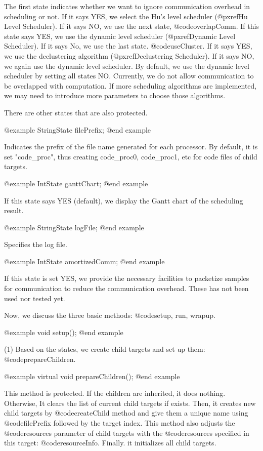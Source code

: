 The first state indicates whether we want to ignore communication overhead
in scheduling or not. If it says YES, we select the Hu's level scheduler
(@pxref{Hu Level Scheduler}). If it says NO, we use the next state,
@code{overlapComm}. If this state says YES, we use the dynamic level scheduler
(@pxref{Dynamic Level Scheduler}). If it says No, we use the last state.
@code{useCluster}. If it says YES, we use the declustering algorithm
(@pxref{Declustering Scheduler}). If it says NO, we again use the dynamic
level scheduler. By default, we use the dynamic level scheduler by setting
all states NO. Currently, we do not allow communication to be overlapped
with computation. If more scheduling algorithms are implemented, we may need
to introduce more parameters to choose those algorithms. 

There are other states that are also protected.

@example
StringState filePrefix;
@end example

Indicates the prefix of the file name generated for each processor.
By default, it is set "code_proc", thus creating code_proc0, code_proc1, etc
for code files of child targets.

@example
IntState ganttChart;
@end example

If this state says YES (default), we display the Gantt chart of the 
scheduling result. 

@example
StringState logFile;
@end example

Specifies the log file.

@example
IntState amortizedComm;
@end example

If this state is set YES, we provide the necessary facilities to packetize
samples for communication to reduce the communication overhead. These
has not been used nor tested yet.

Now, we discuss the three basic methods: @code{setup, run, wrapup}.

@example
void setup();
@end example

(1) Based on the states, we create child targets and set up them:
@code{prepareChildren}.

@example
virtual void prepareChildren();
@end example

This method is protected. If the children are inherited, it does nothing.
Otherwise, It clears the list of current child targets if exists. Then,
it creates new child targets by @code{createChild} method and give them
a unique name using @code{filePrefix} followed by the target index.
This method also adjusts the @code{resources} parameter of child targets
with the @code{resources} specified in this target: @code{resourceInfo}.
Finally. it initializes all child targets.

